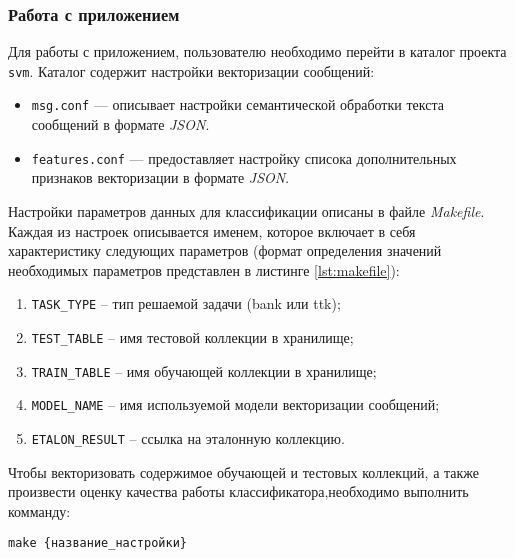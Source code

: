     \subsubsection{Работа с приложением}

        Для работы с приложением, пользователю необходимо перейти в каталог проекта {\tt svm}.
        Каталог содержит настройки векторизации сообщений:
        \begin{itemize}
            \item {\tt msg.conf} --- описывает настройки семантической обработки текста
                сообщений в формате {\it JSON}.
            \item {\tt features.conf} --- предоставляет настройку списока
                дополнительных признаков векторизации в формате {\it JSON}.
        \end{itemize}

        Настройки параметров данных для классификации описаны в файле {\it Makefile}.
        Каждая из настроек описывается именем, которое включает в себя
        характеристику следующих параметров (формат определения значений необходимых
        параметров представлен в листинге \ref{lst:makefile}):

        \begin{enumerate}
            \item {\tt TASK\_TYPE} -- тип решаемой задачи ({bank} или {ttk});
            \item {\tt TEST\_TABLE} -- имя тестовой коллекции в хранилище;
            \item {\tt TRAIN\_TABLE} -- имя обучающей коллекции в хранилище;
            \item {\tt MODEL\_NAME} -- имя используемой модели векторизации сообщений;
            \item {\tt ETALON\_RESULT} -- ссылка на эталонную коллекцию.
        \end{enumerate}

        \lstset{style=bash}
        

        Чтобы векторизовать содержимое обучающей и тестовых коллекций, а также
        произвести оценку качества работы классификатора,необходимо выполнить
        комманду:
        \begin{center}
            {\tt make {\{название\_настройки\}}}
        \end{center}

